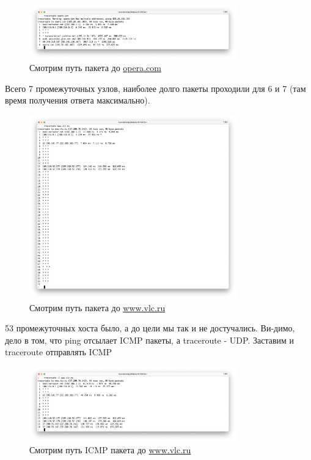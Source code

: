\documentclass[a4paper]{article}
\begin{document}
  \begin{figure}[H]
    \centering
    \includegraphics[width=0.8\textwidth]{s29}
    \caption{Смотрим путь пакета до \href{opera.com}{opera.com}}
  \end{figure}

  Всего 7 промежуточных узлов, наиболее долго пакеты проходили для 6 и 7 (там время получения ответа максимально).
  
  \begin{figure}[H]
    \centering
    \includegraphics[width=0.8\textwidth]{s210}
    \caption{Смотрим путь пакета до \href{www.vlc.ru}{www.vlc.ru}}
  \end{figure}

  53 промежуточных хоста было, а до цели мы так и не достучались. Ви-димо, дело в том, что ping отсылает
  ICMP пакеты, а traceroute - UDP. Заставим и traceroute отправлять ICMP
  \begin{figure}[H]
    \centering
    \includegraphics[width=0.8\textwidth]{s211}
    \caption{Смотрим путь ICMP пакета до \href{www.vlc.ru}{www.vlc.ru}}
  \end{figure}
\end{document}
